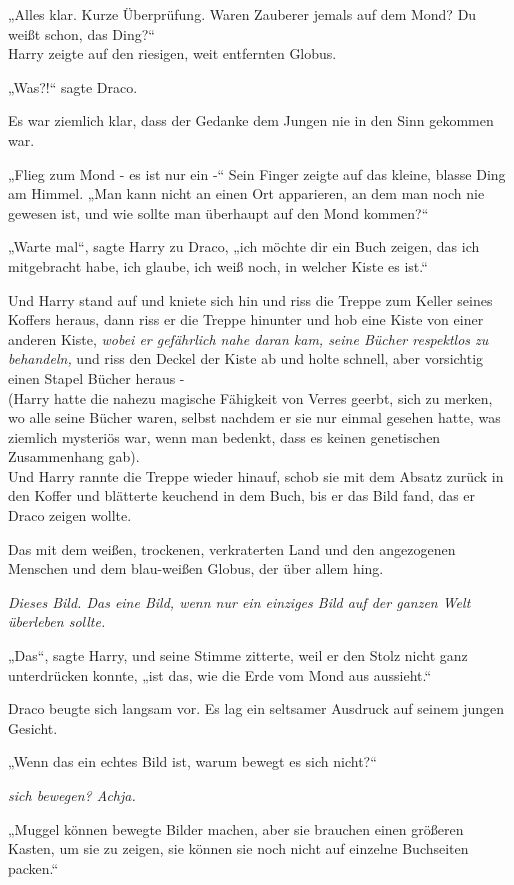 {„Alles klar. Kurze Überprüfung. Waren Zauberer jemals auf dem Mond? Du weißt schon, das Ding?“\\ Harry zeigte auf den riesigen, weit entfernten Globus.

„Was?!“ sagte Draco.

Es war ziemlich klar, dass der Gedanke dem Jungen nie in den Sinn gekommen war.

„Flieg zum Mond - es ist nur ein -“ Sein Finger zeigte auf das kleine, blasse Ding am Himmel. „Man kann nicht an einen Ort apparieren, an dem man noch nie gewesen ist, und wie sollte man überhaupt auf den Mond kommen?“

„Warte mal“, sagte Harry zu Draco, „ich möchte dir ein Buch zeigen, das ich mitgebracht habe, ich glaube, ich weiß noch, in welcher Kiste es ist.“

Und Harry stand auf und kniete sich hin und riss die Treppe zum Keller seines Koffers heraus, dann riss er die Treppe hinunter und hob eine Kiste von einer anderen Kiste, \emph{wobei er gefährlich nahe daran kam, seine Bücher respektlos zu behandeln,} und riss den Deckel der Kiste ab und holte schnell, aber vorsichtig einen Stapel Bücher heraus -\\ (Harry hatte die nahezu magische Fähigkeit von Verres geerbt, sich zu merken, wo alle seine Bücher waren, selbst nachdem er sie nur einmal gesehen hatte, was ziemlich mysteriös war, wenn man bedenkt, dass es keinen genetischen Zusammenhang gab).\\ Und Harry rannte die Treppe wieder hinauf, schob sie mit dem Absatz zurück in den Koffer und blätterte keuchend in dem Buch, bis er das Bild fand, das er Draco zeigen wollte.

Das mit dem weißen, trockenen, verkraterten Land und den angezogenen Menschen und dem blau-weißen Globus, der über allem hing.

\emph{Dieses Bild. Das eine Bild, wenn nur ein einziges Bild auf der ganzen Welt überleben sollte.}

„Das“, sagte Harry, und seine Stimme zitterte, weil er den Stolz nicht ganz unterdrücken konnte, „ist das, wie die Erde vom Mond aus aussieht.“

Draco beugte sich langsam vor. Es lag ein seltsamer Ausdruck auf seinem jungen Gesicht.

„Wenn das ein echtes Bild ist, warum bewegt es sich nicht?“

\emph{sich bewegen? Achja.}

„Muggel können bewegte Bilder machen, aber sie brauchen einen größeren Kasten, um sie zu zeigen, sie können sie noch nicht auf einzelne Buchseiten packen.“

}

